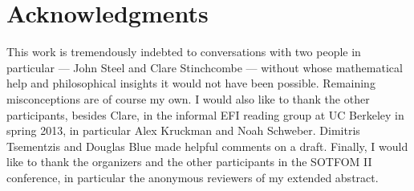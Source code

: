 \documentclass[letterpaper,12pt]{article}
\begin{document}
\section{Acknowledgments}
This work is tremendously indebted to conversations with two people in particular --- John Steel and Clare Stinchcombe --- without whose mathematical help and philosophical insights it would not have been possible. Remaining misconceptions are of course my own. I would also like to thank the other participants, besides Clare, in the informal EFI reading group at UC Berkeley in spring 2013, in particular Alex Kruckman and Noah Schweber. Dimitris Tsementzis and Douglas Blue made helpful comments on a draft. Finally, I would like to thank the organizers and the other participants in the SOTFOM II conference, in particular the anonymous reviewers of my extended abstract.


\end{document}
